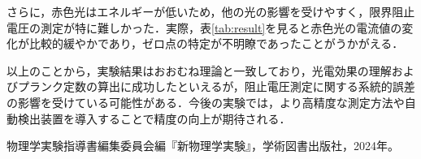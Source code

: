 \documentclass[a4paper,11pt,dvipdfmx]{jsarticle}
\begin{document}
さらに，赤色光はエネルギーが低いため，他の光の影響を受けやすく，限界阻止電圧の測定が特に難しかった．実際，表\ref{tab:result}を見ると赤色光の電流値の変化が比較的緩やかであり，ゼロ点の特定が不明瞭であったことがうかがえる．

以上のことから，実験結果はおおむね理論と一致しており，光電効果の理解およびプランク定数の算出に成功したといえるが，阻止電圧測定に関する系統的誤差の影響を受けている可能性がある．今後の実験では，より高精度な測定方法や自動検出装置を導入することで精度の向上が期待される．




\begin{thebibliography}{9}
物理学実験指導書編集委員会編『新物理学実験』，学術図書出版社，2024年。
\end{thebibliography}
\end{document}
